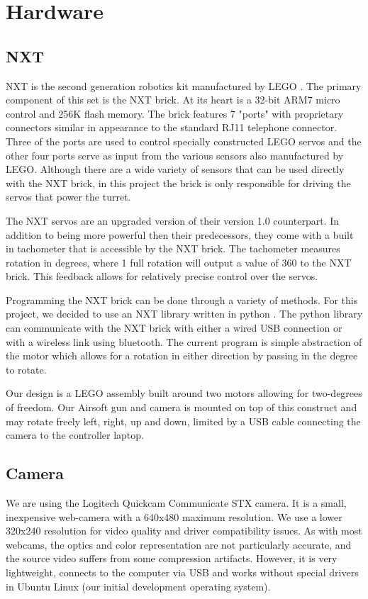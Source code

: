 \documentclass[10pt,twocolumn,letterpaper]{article}
\begin{document}
\section{Hardware}

\subsection{NXT}

NXT is the second generation robotics kit manufactured by LEGO \cite{nxt}. The primary component of this set is the NXT brick. At its heart is a 32-bit ARM7 micro control and 256K flash memory. The brick features 7 "ports" with proprietary connectors similar in appearance to the standard RJ11 telephone connector. Three of the ports are used to control specially constructed LEGO servos and the other four ports serve as input from the various sensors also manufactured by LEGO. Although there are a wide variety of sensors that can be used directly with the NXT brick, in this project the brick is only responsible for driving the servos that power the turret.

The NXT servos are an upgraded version of their version 1.0 counterpart. In addition to being more powerful then their predecessors, they come with a built in tachometer that is accessible by the NXT brick. The tachometer measures rotation in degrees, where 1 full rotation will output a value of 360 to the NXT brick. This feedback allows for relatively precise control over the servos.

Programming the NXT brick can be done through a variety of methods. For this project, we decided to use an NXT library written in python \cite{pynxt}. The python library can communicate with the NXT brick with either a wired USB connection or with a wireless link using bluetooth. The current program is simple abstraction of the motor which allows for a rotation in either direction by passing in the degree to rotate.

Our design is a LEGO assembly built around two motors allowing for two-degrees of freedom. Our Airsoft gun and camera is mounted on top of this construct and may rotate freely left, right, up and down, limited by a USB cable connecting the camera to the controller laptop.
 
\subsection{Camera}

We are using the Logitech Quickcam Communicate STX \cite{logi} camera.  It is a small, inexpensive web-camera with a 640x480 maximum resolution.  We use a lower 320x240 resolution for video quality and driver compatibility issues.  As with most webcams, the optics and color representation are not particularly accurate, and the source video suffers from some compression artifacts.  However, it is very lightweight, connects to the computer via USB and works without special drivers in Ubuntu Linux (our initial development operating system).
\end{document}
